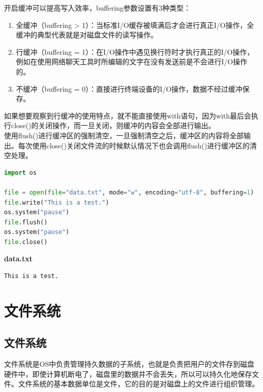 开启缓冲可以提高写入效率，buffering参数设置有3种类型：

\begin{enumerate}
	\item 全缓冲（buffering > 1）：当标准I/O缓存被填满后才会进行真正I/O操作，全缓冲的典型代表就是对磁盘文件的读写操作。

	\item 行缓冲（buffering = 1）：在I/O操作中遇见换行符时才执行真正的I/O操作，例如在使用网络聊天工具时所编辑的文字在没有发送前是不会进行I/O操作的。

	\item 不缓冲（buffering = 0）：直接进行终端设备的I/O操作，数据不经过缓冲保存。
\end{enumerate}

如果想要观察到行缓冲的使用特点，就不能直接使用with语句，因为with最后会执行close()的关闭操作，而一旦关闭，则缓冲的内容会全部进行输出。\\

使用flush()进行缓冲区的强制清空，一旦强制清空之后，缓冲区的内容将全部输出。每次使用close()关闭文件流的时候默认情况下也会调用flush()进行缓冲区的清空处理。\\


\begin{lstlisting}[language=Python]
import os

file = open(file="data.txt", mode="w", encoding="utf-8", buffering=1)
file.write("This is a test.")
os.system("pause")
file.flush()
os.system("pause")
file.close()
\end{lstlisting}

\begin{tcolorbox}
	\textbf{data.txt}
	\begin{verbatim}
This is a test.
	\end{verbatim}
\end{tcolorbox}

\newpage

\section{文件系统}

\subsection{文件系统}

文件系统是OS中负责管理持久数据的子系统，也就是负责把用户的文件存到磁盘硬件中，即使计算机断电了，磁盘里的数据并不会丢失，所以可以持久化地保存文件。文件系统的基本数据单位是文件，它的目的是对磁盘上的文件进行组织管理。\\

